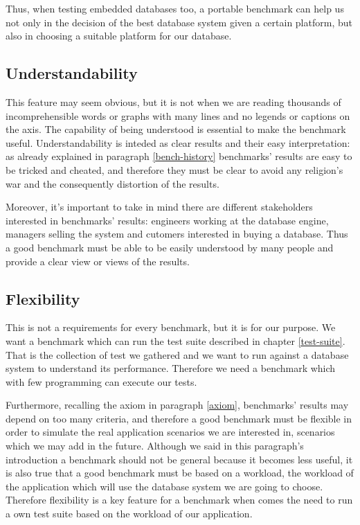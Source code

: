 Thus, when testing embedded databases too, a portable benchmark can help us not only in the decision of the best database system given a certain platform, but also in choosing a suitable platform for our database.

		\subsection{Understandability}
This feature may seem obvious, but it is not when we are reading thousands of incomprehensible words or graphs with many lines and no legends or captions on the axis. The capability of being understood is essential to make the benchmark useful. Understandability is inteded as clear results and their easy interpretation:  as already explained in paragraph \ref{bench-history} benchmarks' results are easy to be tricked and cheated, and therefore they must be clear to avoid any religion's war and the consequently distortion of the results. 

Moreover, it's important to take in mind there are different stakeholders interested in benchmarks' results: engineers working at the database engine, managers selling the system and cutomers interested in buying a database. Thus a good benchmark must be able to be easily understood by many people and provide a clear view or views of the results.

		\subsection{Flexibility} \label{flexibility}
This is not a requirements for every benchmark, but it is for our purpose. We want a benchmark which can run the test suite described in chapter \ref{test-suite}. That is the collection of test we gathered and we want to run against a database system to understand its performance. Therefore we need a benchmark which with few programming can execute our tests. 

Furthermore, recalling the axiom in paragraph \ref{axiom}, benchmarks' results may depend on too many criteria, and therefore a good benchmark must be flexible in order to simulate the real application scenarios we are interested in, scenarios which we may add in the future. Although we said in this paragraph's introduction a benchmark should not be general because it becomes less useful, it is also true that a good benchmark must be based on a workload, the workload of the application which will use the database system we are going to choose. Therefore flexibility is a key feature for a benchmark when comes the need to run a own test suite based on the workload of our application.
		
